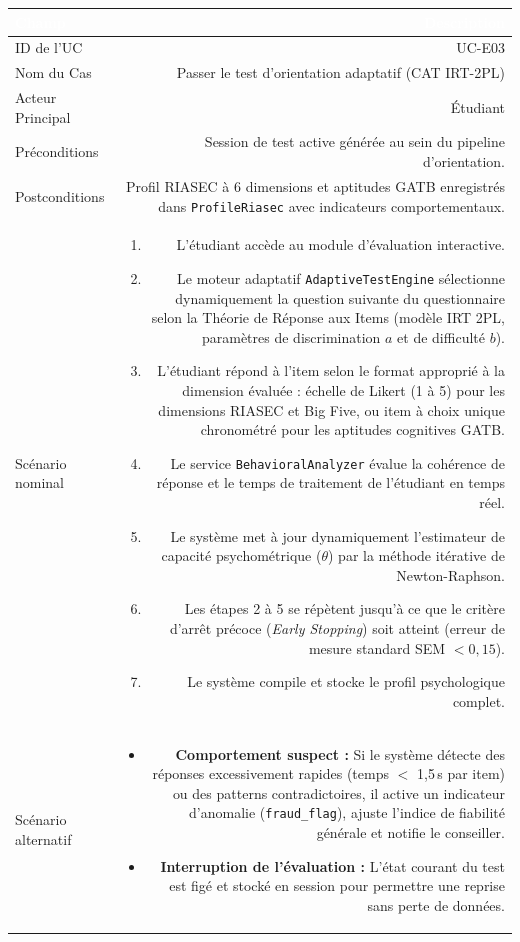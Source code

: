 \noindent
\begin{tabular}{|L|R|}
\hline
{}\textcolor{white}{\textbf{Champ}} & \textcolor{white}{\textbf{Description}} \\
\hline
{}ID de l'UC & UC-E03 \\
\hline
Nom du Cas & Passer le test d'orientation adaptatif (CAT IRT-2PL) \\
\hline
{}Acteur Principal & Étudiant \\
\hline
Préconditions & Session de test active générée au sein du pipeline d'orientation. \\
\hline
{}Postconditions & Profil RIASEC à 6 dimensions et aptitudes GATB enregistrés dans \texttt{ProfileRiasec} avec indicateurs comportementaux. \\
\hline
Scénario nominal &
\begin{enumerate}
  \item L'étudiant accède au module d'évaluation interactive.
  \item Le moteur adaptatif \texttt{AdaptiveTestEngine} sélectionne dynamiquement la question suivante du questionnaire selon la Théorie de Réponse aux Items (modèle IRT 2PL, paramètres de discrimination $a$ et de difficulté $b$).
  \item L'étudiant répond à l'item selon le format approprié à la dimension évaluée : échelle de Likert (1 à 5) pour les dimensions RIASEC et Big Five, ou item à choix unique chronométré pour les aptitudes cognitives GATB.
  \item Le service \texttt{BehavioralAnalyzer} évalue la cohérence de réponse et le temps de traitement de l'étudiant en temps réel.
  \item Le système met à jour dynamiquement l'estimateur de capacité psychométrique ($\theta$) par la méthode itérative de Newton-Raphson.
  \item Les étapes 2 à 5 se répètent jusqu'à ce que le critère d'arrêt précoce (\textit{Early Stopping}) soit atteint (erreur de mesure standard SEM $< 0{,}15$).
  \item Le système compile et stocke le profil psychologique complet.
\end{enumerate} \\
\hline
{}Scénario alternatif &
\begin{itemize}
  \item \textbf{Comportement suspect :} Si le système détecte des réponses excessivement rapides (temps $<$ 1,5\,s par item) ou des patterns contradictoires, il active un indicateur d'anomalie (\texttt{fraud\_flag}), ajuste l'indice de fiabilité générale et notifie le conseiller.
  \item \textbf{Interruption de l'évaluation :} L'état courant du test est figé et stocké en session pour permettre une reprise sans perte de données.
\end{itemize} \\
\hline
\end{tabular}

